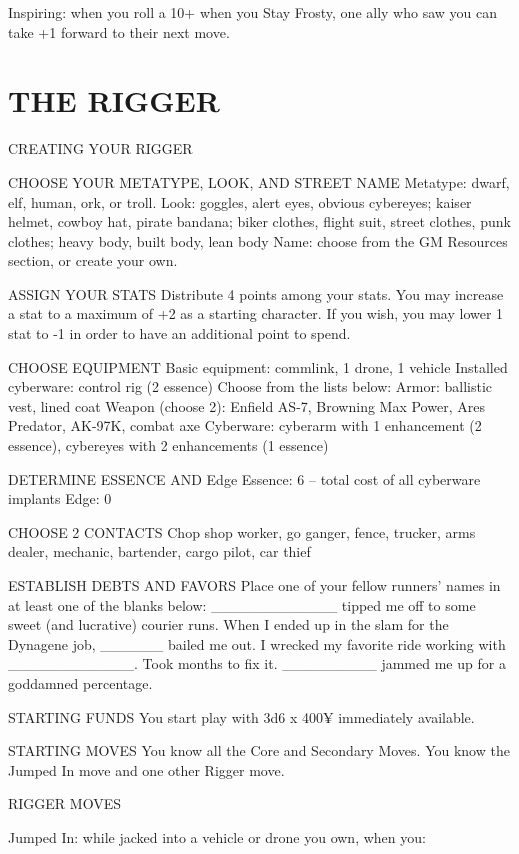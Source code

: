 Inspiring: when you roll a 10+ when you Stay Frosty, one ally who saw you can take +1 forward to their next move.



\clearpage
\section{THE RIGGER}
CREATING YOUR RIGGER

CHOOSE YOUR METATYPE, LOOK, AND STREET NAME
Metatype: dwarf, elf, human, ork, or troll.
Look: goggles, alert eyes, obvious cybereyes; kaiser helmet, cowboy hat, pirate bandana; biker clothes, flight suit, street clothes, punk clothes; heavy body, built body, lean body
Name: choose from the GM Resources section, or create your own.

ASSIGN YOUR STATS
Distribute 4 points among your stats. You may increase a stat to a maximum of +2 as a starting character. If you wish, you may lower 1 stat to -1 in order to have an additional point to spend.

CHOOSE EQUIPMENT
Basic equipment: commlink, 1 drone, 1 vehicle
Installed cyberware: control rig (2 essence)
Choose from the lists below:
Armor: ballistic vest, lined coat
Weapon (choose 2): Enfield AS-7, Browning Max Power, Ares Predator, AK-97K, combat axe
Cyberware: cyberarm with 1 enhancement (2 essence), cybereyes with 2 enhancements (1 essence)

DETERMINE ESSENCE AND Edge
Essence: 6 – total cost of all cyberware implants
Edge: 0

CHOOSE 2 CONTACTS
Chop shop worker, go ganger, fence, trucker, arms dealer, mechanic, bartender, cargo pilot, car thief

ESTABLISH DEBTS AND FAVORS
Place one of your fellow runners’ names in at least one of the blanks below:
\_\_\_\_\_\_\_\_\_\_\_\_ tipped me off to some sweet (and lucrative) courier runs.
When I ended up in the slam for the Dynagene job, \_\_\_\_\_\_ bailed me out.
I wrecked my favorite ride working with \_\_\_\_\_\_\_\_\_\_\_\_. Took months to fix it.
\_\_\_\_\_\_\_\_\_ jammed me up for a goddamned percentage.

STARTING FUNDS
You start play with 3d6 x 400¥ immediately available.

STARTING MOVES
You know all the Core and Secondary Moves. You know the Jumped In move and one other Rigger move.

RIGGER MOVES

Jumped In: while jacked into a vehicle or drone you own, when you:

